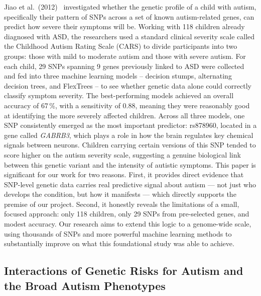Jiao et al.\ (2012)~\cite{jiao2012} investigated whether the genetic
profile of a child with autism, specifically their pattern of SNPs
across a set of known autism-related genes, can predict how severe
their symptoms will be. Working with 118 children already diagnosed
with ASD, the researchers used a standard clinical severity scale
called the Childhood Autism Rating Scale (CARS) to divide participants
into two groups: those with mild to moderate autism and those with
severe autism. For each child, 29 SNPs spanning 9 genes previously
linked to ASD were collected and fed into three machine learning models
-- decision stumps, alternating decision trees, and FlexTrees -- to
see whether genetic data alone could correctly classify symptom
severity. The best-performing models achieved an overall accuracy of
67\,\%, with a sensitivity of 0.88, meaning they were reasonably good
at identifying the more severely affected children. Across all three
models, one SNP consistently emerged as the most important predictor:
rs878960, located in a gene called \textit{GABRB3}, which plays a role
in how the brain regulates key chemical signals between neurons.
Children carrying certain versions of this SNP tended to score higher
on the autism severity scale, suggesting a genuine biological link
between this genetic variant and the intensity of autistic
symptoms. This paper is significant for our work for two reasons.
First, it provides direct evidence that SNP-level genetic data carries
real predictive signal about autism --- not just who develops the
condition, but how it manifests --- which directly supports the
premise of our project. Second, it honestly reveals the limitations of
a small, focused approach: only 118 children, only 29 SNPs from
pre-selected genes, and modest accuracy. Our research aims to extend
this logic to a genome-wide scale, using thousands of SNPs and more
powerful machine learning methods to substantially improve on what
this foundational study was able to achieve.

\subsection{Interactions of Genetic Risks for Autism and the Broad Autism Phenotypes}

